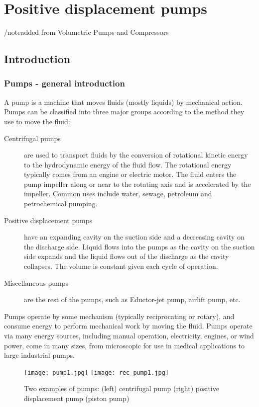 \chapter{Positive displacement pumps}
/note{added from Volumetric Pumps and Compressors}

\section{Introduction}

\subsection{Pumps - general introduction}

A pump is a machine that moves fluids (mostly liquids) by mechanical action. Pumps can be classified into three major groups according to the method they use to move the fluid: 
\begin{description}
\item[Centrifugal pumps] are used to transport fluids by the conversion of rotational kinetic energy to the hydrodynamic energy of the fluid flow. The rotational energy typically comes from an engine or electric motor. The fluid enters the pump impeller along or near to the rotating axis and is accelerated by the impeller. Common uses include water, sewage, petroleum and petrochemical pumping. 

\item[Positive displacement pumps] have an expanding cavity on the suction side and a decreasing cavity on the discharge side. Liquid flows into the pumps as the cavity on the suction side expands and the liquid flows out of the discharge as the cavity collapses. The volume is constant given each cycle of operation.

\item[Miscellaneous pumps] are the rest of the pumps, such as Eductor-jet pump, airlift pump, etc.
\end{description}

Pumps operate by some mechanism (typically reciprocating or rotary), and consume energy to perform mechanical work by moving the fluid. Pumps operate via many energy sources, including manual operation, electricity, engines, or wind power, come in many sizes, from microscopic for use in medical applications to large industrial pumps.

\begin{figure}[h]
\begin{center}
\texttt{[image: pump1.jpg]}
\texttt{[image: rec\_pump1.jpg]}
\caption{\label{fig:pumps}Two examples of pumps: (left) centrifugal pump (right) positive displacement pump (piston pump)}
\end{center}
\end{figure}

